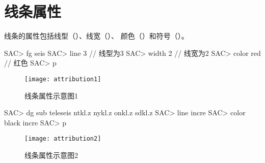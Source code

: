 \section{线条属性}
\label{sec:line-attribution}

线条的属性包括线型（）、线宽（）、
颜色（）和符号（）。

\begin{SACCode}
SAC> fg seis
SAC> line 3         // 线型为3
SAC> width 2        // 线宽为2
SAC> color red      // 红色
SAC> p
\end{SACCode}

\begin{figure}[H]
\centering
\texttt{[image: attribution1]}
\caption{线条属性示意图1}
\end{figure}

\begin{SACCode}
SAC> dg sub teleseis ntkl.z nykl.z onkl.z sdkl.z
SAC> line incre
SAC> color black incre
SAC> p
\end{SACCode}

\begin{figure}[H]
\centering
\texttt{[image: attribution2]}
\caption{线条属性示意图2}
\end{figure}
